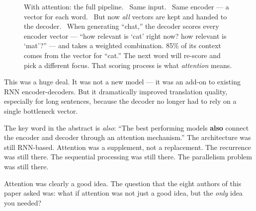 \begin{figure}[htb]
\caption{With attention: the full pipeline. ~Same input. ~Same encoder --- a vector for each word. ~But now \emph{all} vectors are kept and handed to the decoder. ~When generating ``chat,'' the decoder scores every encoder vector --- ``how relevant is `cat' right now? how relevant is `mat'?'' --- and takes a weighted combination. 85\% of its context comes from the vector for ``cat.'' The next word will re-score and pick a different focus. That scoring process is what \emph{attention} means.}
\end{figure}

This was a huge deal.
It was not a new model --- it was an add-on to existing RNN encoder-decoders.
But it dramatically improved translation quality, especially for long sentences, because the decoder no longer had to rely on a single bottleneck vector.

The key word in the abstract is \emph{also}: ``The best performing models \textbf{also} connect the encoder and decoder through an attention mechanism.''
The architecture was still RNN-based.
Attention was a supplement, not a replacement.
The recurrence was still there.
The sequential processing was still there.
The parallelism problem was still there.

Attention was clearly a good idea.
The question that the eight authors of this paper asked was: what if attention was not just a good idea, but the \emph{only} idea you needed?
